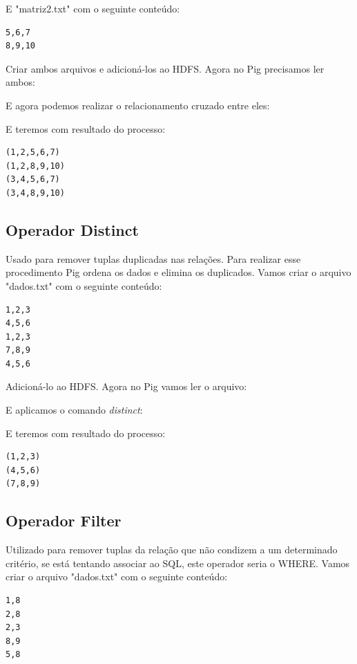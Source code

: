 \documentclass[a4paper,11pt]{article}
\begin{document}
E "matriz2.txt" com o seguinte conteúdo:
\begin{lstlisting}[]
5,6,7
8,9,10
\end{lstlisting}

Criar ambos arquivos e adicioná-los ao HDFS. Agora no Pig precisamos ler ambos: \\

E agora podemos realizar o relacionamento cruzado entre eles: \\

E teremos com resultado do processo:
\begin{lstlisting}[]
(1,2,5,6,7)
(1,2,8,9,10)
(3,4,5,6,7)
(3,4,8,9,10)
\end{lstlisting}

\subsection{Operador Distinct}
Usado para remover tuplas duplicadas nas relações. Para realizar esse procedimento Pig ordena os dados e elimina os duplicados. Vamos criar o arquivo "dados.txt" com o seguinte conteúdo:
\begin{lstlisting}[]
1,2,3
4,5,6
1,2,3
7,8,9
4,5,6
\end{lstlisting}

Adicioná-lo ao HDFS. Agora no Pig vamos ler o arquivo: \\

E aplicamos o comando \textit{distinct}: \\

E teremos com resultado do processo:
\begin{lstlisting}[]
(1,2,3)
(4,5,6)
(7,8,9)
\end{lstlisting}

\subsection{Operador Filter}
Utilizado para remover tuplas da relação que não condizem a um determinado critério, se está tentando associar ao SQL, este operador seria o WHERE. Vamos criar o arquivo "dados.txt" com o seguinte conteúdo:
\begin{lstlisting}[]
1,8
2,8
2,3
8,9
5,8
\end{lstlisting}
\end{document}
